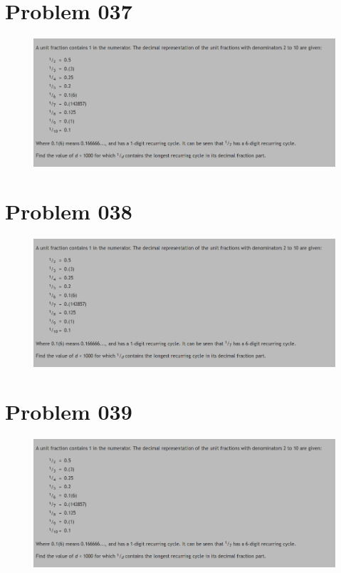 \section{Problem 037}
\begin{prob}
	\begin{figure}[htb!]
		\begin{center}
			\includegraphics[scale = 0.4]{pic/026.png}
		\end{center}
	\end{figure}
\end{prob}
\section{Problem 038}
\begin{prob}
	\begin{figure}[htb!]
		\begin{center}
			\includegraphics[scale = 0.4]{pic/026.png}
		\end{center}
	\end{figure}
\end{prob}
\section{Problem 039}
\begin{prob}
	\begin{figure}[htb!]
		\begin{center}
			\includegraphics[scale = 0.4]{pic/026.png}
		\end{center}
	\end{figure}
\end{prob}
